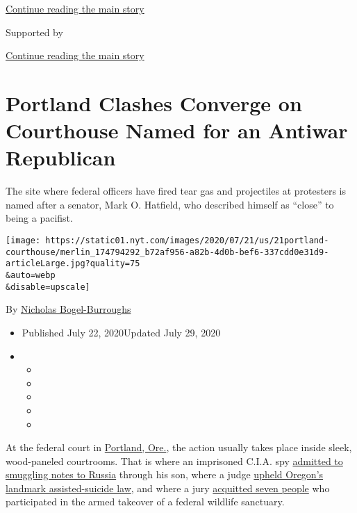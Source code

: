 \protect\hyperlink{after-top}{Continue reading the main story}

Supported by

\protect\hyperlink{after-sponsor}{Continue reading the main story}

\hypertarget{portland-clashes-converge-on-courthouse-named-for-an-antiwar-republican}{%
\section{Portland Clashes Converge on Courthouse Named for an Antiwar
Republican}\label{portland-clashes-converge-on-courthouse-named-for-an-antiwar-republican}}

The site where federal officers have fired tear gas and projectiles at
protesters is named after a senator, Mark O. Hatfield, who described
himself as ``close'' to being a pacifist.

\texttt{[image: https://static01.nyt.com/images/2020/07/21/us/21portland-courthouse/merlin\_174794292\_b72af956-a82b-4d0b-bef6-337cdd0e31d9-articleLarge.jpg?quality=75\\\&auto=webp\\\&disable=upscale]}

By \href{https://www.nytimes.com/by/nicholas-bogel-burroughs}{Nicholas
Bogel-Burroughs}

\begin{itemize}
\item
  Published July 22, 2020Updated July 29, 2020
\item
  \begin{itemize}
  \item
  \item
  \item
  \item
  \item
  \end{itemize}
\end{itemize}

At the federal court in
\href{https://www.nytimes.com/interactive/2020/07/22/us/portland-protests.html}{Portland,
Ore.}, the action usually takes place inside sleek, wood-paneled
courtrooms. That is where an imprisoned C.I.A. spy
\href{https://www.oregonlive.com/portland/2010/11/former_cia_spy_jim_nicholson_p_1.html}{admitted
to smuggling notes to Russia} through his son, where a judge
\href{https://www.cnn.com/2002/LAW/04/17/oregon.assisted.suicide/}{upheld
Oregon's landmark assisted-suicide law}, and where a jury
\href{https://www.nytimes.com/2016/10/28/us/bundy-brothers-acquitted-in-takeover-of-oregon-wildlife-refuge.html}{acquitted
seven people} who participated in the armed takeover of a federal
wildlife sanctuary.

